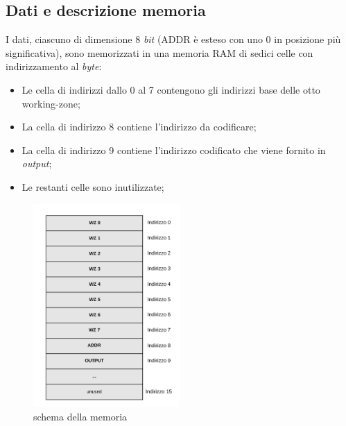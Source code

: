 \documentclass{article}
\begin{document}
\subsection{Dati e descrizione memoria}
I dati, ciascuno di dimensione 8 \textit{bit} (ADDR è esteso con uno 0 in posizione più significativa), sono memorizzati in una memoria RAM di sedici celle con indirizzamento al \textit{byte}:
\begin{itemize}
\item Le cella di indirizzi dallo 0 al 7 contengono gli indirizzi base delle otto working-zone;
\item La cella di indirizzo 8 contiene l'indirizzo da codificare;
\item La cella di indirizzo 9 contiene l'indirizzo codificato che viene fornito in \textit{output};
\item Le restanti celle sono inutilizzate;
\end{itemize}
\begin{figure}[h]
    \centering
    \includegraphics[width=0.5\textwidth]{memoria}
    \caption{schema della memoria}
\end{figure}
\pagebreak
\end{document}
